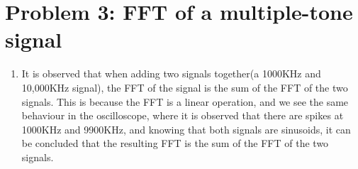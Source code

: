 \section{Problem 3: FFT of a multiple-tone signal}
\begin{enumerate}
    \item It is observed that when adding two signals together(a 1000KHz and 10,000KHz signal), the FFT of the signal is the sum of the FFT of the two signals. This is because the FFT is a linear operation, and we see the same behaviour in the oscilloscope, where it is observed that there are spikes at 1000KHz and 9900KHz, and knowing that both signals are sinusoids, it can be concluded that the resulting FFT is the sum of the FFT of the two signals.
\end{enumerate}